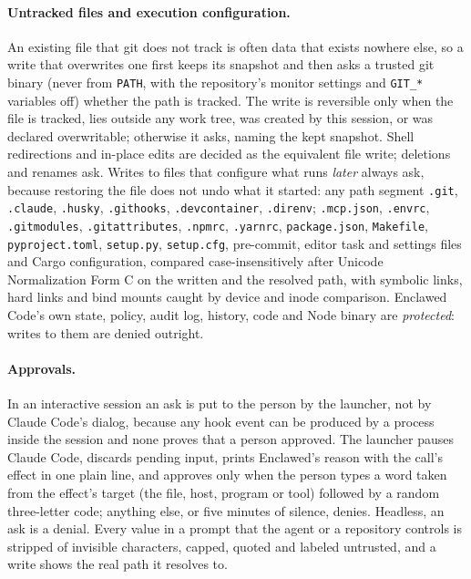 \documentclass[11pt]{article}
\newcommand{\sys}{Enclawed}
\newcommand{\cz}{Enclawed Code}
\begin{document}
\paragraph{Untracked files and execution configuration.} An existing
file that git does not track is often data that exists nowhere else, so
a write that overwrites one first keeps its snapshot and then asks a
trusted git binary (never from \texttt{PATH}, with the repository's
monitor settings and \texttt{GIT\_*} variables off) whether the path is
tracked. The write is reversible only when the file is tracked, lies
outside any work tree, was created by this session, or was declared
overwritable; otherwise it asks, naming the kept snapshot. Shell
redirections and in-place edits are decided as the equivalent file
write; deletions and renames ask. Writes to files that configure what
runs \emph{later} always ask, because restoring the file does not undo
what it started: any path segment \texttt{.git}, \texttt{.claude},
\texttt{.husky}, \texttt{.githooks}, \texttt{.devcontainer},
\texttt{.direnv}; \texttt{.mcp.json}, \texttt{.envrc},
\texttt{.gitmodules}, \texttt{.gitattributes}, \texttt{.npmrc},
\texttt{.yarnrc}, \texttt{package.json}, \texttt{Makefile},
\texttt{pyproject.toml}, \texttt{setup.py}, \texttt{setup.cfg},
pre-commit, editor task and settings files and Cargo configuration,
compared case-insensitively after Unicode Normalization Form C on the
written and the resolved path, with symbolic links, hard links and bind
mounts caught by device and inode comparison. \cz{}'s own state, policy,
audit log, history, code and Node binary are \emph{protected}: writes to
them are denied outright.

\paragraph{Approvals.}
\label{sec:approval}
In an interactive session an ask is put to the person by the launcher,
not by Claude Code's dialog, because any hook event can be produced by a
process inside the session and none proves that a person approved. The
launcher pauses Claude Code, discards pending input, prints \sys{}'s
reason with the call's effect in one plain line, and approves only when
the person types a word taken from the effect's target (the file, host,
program or tool) followed by a random three-letter code; anything else, or five minutes of silence, denies. Headless, an
ask is a denial. Every value in a prompt that the agent or a repository
controls is stripped of invisible characters, capped, quoted and labeled
untrusted, and a write shows the real path it resolves to.
\end{document}
